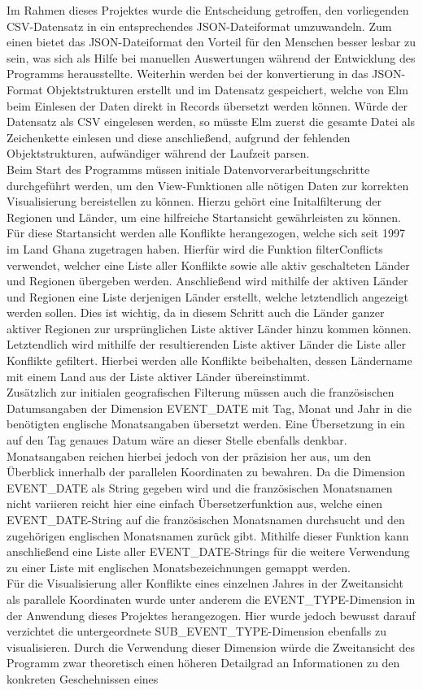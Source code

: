 \documentclass[usegeometry=true]{scrartcl}
\begin{document}
Im Rahmen dieses Projektes wurde die Entscheidung getroffen, den vorliegenden CSV-Datensatz in ein entsprechendes JSON-Dateiformat umzuwandeln. Zum einen bietet das JSON-Dateiformat den Vorteil für den Menschen besser lesbar zu sein, was sich als Hilfe bei manuellen Auswertungen während der Entwicklung des Programms herausstellte. Weiterhin werden bei der konvertierung in das JSON-Format Objektstrukturen erstellt und im Datensatz gespeichert, welche von Elm beim Einlesen der Daten direkt in Records übersetzt werden können. Würde der Datensatz als CSV eingelesen werden, so müsste Elm zuerst die gesamte Datei als Zeichenkette einlesen und diese anschließend, aufgrund der fehlenden Objektstrukturen, aufwändiger während der Laufzeit parsen.\\ Beim Start des Programms müssen initiale Datenvorverarbeitungschritte durchgeführt werden, um den View-Funktionen alle nötigen Daten zur korrekten Visualisierung bereistellen zu können. Hierzu gehört eine Initalfilterung der Regionen und Länder, um eine hilfreiche Startansicht gewährleisten zu können. Für diese Startansicht werden alle Konflikte herangezogen, welche sich seit 1997 im Land Ghana zugetragen haben. Hierfür wird die Funktion filterConflicts verwendet, welcher eine Liste aller Konflikte sowie alle aktiv geschalteten Länder und Regionen übergeben werden. Anschließend wird mithilfe der aktiven Länder und Regionen eine Liste derjenigen Länder erstellt, welche letztendlich angezeigt werden sollen. Dies ist wichtig, da in diesem Schritt auch die Länder ganzer aktiver Regionen zur ursprünglichen Liste aktiver Länder hinzu kommen können. Letztendlich wird mithilfe der resultierenden Liste aktiver Länder die Liste aller Konflikte gefiltert. Hierbei werden alle Konflikte beibehalten, dessen Ländername mit einem Land aus der Liste aktiver Länder übereinstimmt.\\ Zusätzlich zur initialen geografischen Filterung müssen auch die französischen Datumsangaben der Dimension EVENT\_DATE mit Tag, Monat und Jahr in die benötigten englische Monatsangaben übersetzt werden. Eine Übersetzung in ein auf den Tag genaues Datum wäre an dieser Stelle ebenfalls denkbar. Monatsangaben reichen hierbei jedoch von der präzision her aus, um den Überblick innerhalb der parallelen Koordinaten zu bewahren. Da die Dimension EVENT\_DATE als String gegeben wird und die französischen Monatsnamen nicht variieren reicht hier eine einfach Übersetzerfunktion aus, welche einen EVENT\_DATE-String auf die französischen Monatsnamen durchsucht und den zugehörigen englischen Monatsnamen zurück gibt. Mithilfe dieser Funktion kann anschließend eine Liste aller EVENT\_DATE-Strings für die weitere Verwendung zu einer Liste mit englischen Monatsbezeichnungen gemappt werden.\\ Für die Visualisierung aller Konflikte eines einzelnen Jahres in der Zweitansicht als parallele Koordinaten wurde unter anderem die EVENT\_TYPE-Dimension in der Anwendung dieses Projektes herangezogen. Hier wurde jedoch bewusst darauf verzichtet die untergeordnete SUB\_EVENT\_TYPE-Dimension ebenfalls zu visualisieren. Durch die Verwendung dieser Dimension würde die Zweitansicht des Programm zwar theoretisch einen höheren Detailgrad an Informationen zu den konkreten Geschehnissen eines 
\end{document}

